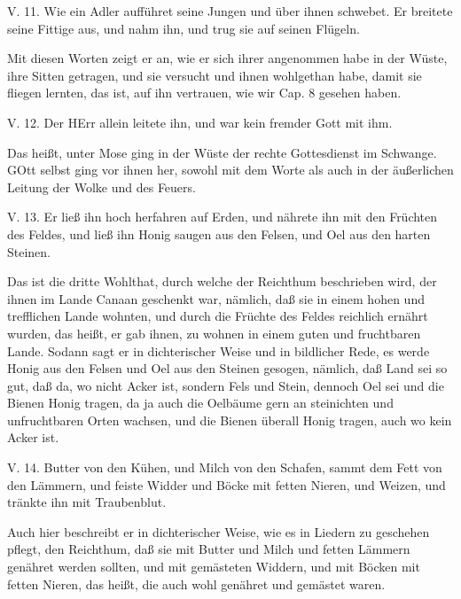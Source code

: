 \begin{schriftzitat}
V. 11. Wie ein Adler aufführet seine Jungen und über ihnen schwebet. Er breitete seine Fittige aus, und nahm ihn, und trug sie auf seinen Flügeln.
\end{schriftzitat}

Mit diesen Worten zeigt er an, wie er sich ihrer angenommen habe in der Wüste, ihre Sitten getragen, und sie versucht und ihnen wohlgethan habe, damit sie fliegen lernten, das ist, auf ihn vertrauen, wie wir Cap. 8 gesehen haben.

\begin{schriftzitat}
V. 12. Der HErr allein leitete ihn, und war kein fremder Gott mit ihm.
\end{schriftzitat}

Das heißt, unter Mose ging in der Wüste der rechte Gottesdienst im Schwange. GOtt selbst ging vor ihnen her, sowohl mit dem Worte als auch in der äußerlichen Leitung der Wolke und des Feuers.

\begin{schriftzitat}
V. 13. Er ließ ihn hoch herfahren auf Erden, und nährete ihn mit den Früchten des Feldes, und ließ ihn Honig saugen aus den Felsen, und Oel aus den harten Steinen.
\end{schriftzitat}

Das ist die dritte Wohlthat, durch welche der Reichthum beschrieben wird, der ihnen im Lande Canaan geschenkt war, nämlich, daß sie in einem hohen und trefflichen Lande wohnten, und durch die Früchte des Feldes reichlich ernährt wurden, das heißt, er gab ihnen, zu wohnen in einem guten und fruchtbaren Lande. Sodann sagt er in dichterischer Weise und in bildlicher Rede, es werde Honig aus den Felsen und Oel aus den Steinen gesogen, nämlich, daß Land sei so gut, daß da, wo nicht Acker ist, sondern Fels und Stein, dennoch Oel sei und die Bienen Honig tragen, da ja auch die Oelbäume gern an steinichten und unfruchtbaren Orten wachsen, und die Bienen überall Honig tragen, auch wo kein Acker ist.

\begin{schriftzitat}
V. 14. Butter von den Kühen, und Milch von den Schafen, sammt dem Fett von den Lämmern, und feiste Widder und Böcke mit fetten Nieren, und Weizen, und tränkte ihn mit Traubenblut.
\end{schriftzitat}

Auch hier beschreibt er in dichterischer Weise, wie es in Liedern zu geschehen pflegt, den Reichthum, daß sie mit Butter und Milch und fetten Lämmern genähret werden sollten, und mit gemästeten Widdern, und mit Böcken mit fetten Nieren, das heißt, die auch wohl genähret und gemästet waren.

